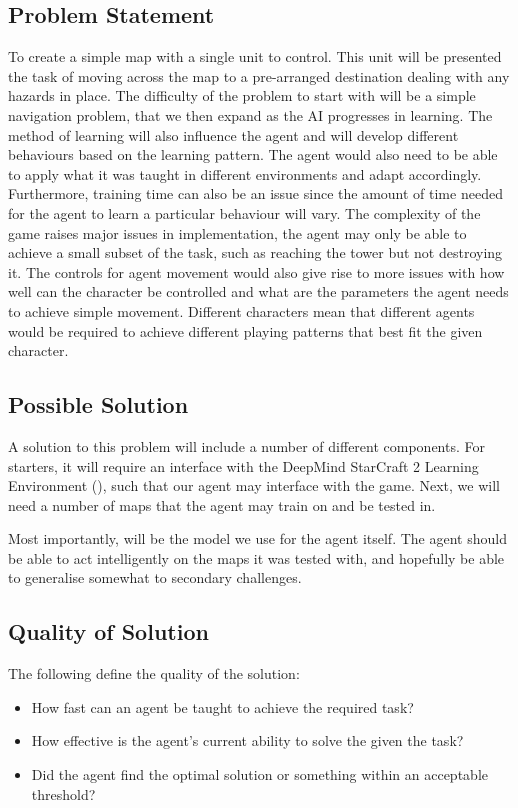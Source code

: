 \documentclass[12pt]{article}
\begin{document}
\subsection{Problem Statement}

To create a simple map with a single unit to control.
This unit will be presented the task of moving across the map to a
pre-arranged destination dealing with any hazards in place.
The difficulty of the problem to start with will be a simple navigation
problem, that we then expand as the AI progresses in learning. The
method of learning will also influence the agent and will develop different
behaviours based on the learning pattern. The agent would also need to be
able to apply what it was taught in different environments and adapt
accordingly. Furthermore, training time can also be an issue since the
amount of time needed for the agent to learn a particular behaviour will vary.
The complexity of the game raises major issues in implementation, the agent
may only be able to achieve a small subset of the task, such as reaching the
tower but not destroying it. The controls for agent movement would also give rise
to more issues with how well can the character be controlled and what are the
parameters the agent needs to achieve simple movement.
Different characters mean that different agents would be required to
achieve different playing patterns that best fit the given character.

\subsection{Possible Solution}

A solution to this problem will include a number of different
components. For starters, it will require an interface with
the DeepMind StarCraft 2 Learning Environment
(\cite{pysc2}),
such that our agent may interface with the game.
Next, we will need a number of maps that the agent may train
on and be tested in.

Most importantly, will be the model we use for the agent itself.
The agent should be able to act intelligently on the maps it was
tested with, and hopefully be able to generalise somewhat
to secondary challenges.

\subsection{Quality of Solution}
The following define the quality of the solution:
\begin{itemize}
    \item How fast can an agent be taught to achieve the required task?
    \item How effective is the agent’s current ability to solve
          the given the task?
    \item Did the agent find the optimal solution or something
          within an acceptable threshold?
\end{itemize}
\end{document}

